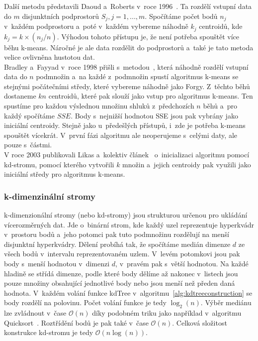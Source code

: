 Další metodu představili Daoud a~Roberts v~roce 1996~\cite{daoud96}. Ta rozdělí vstupní data do $m$ disjunktních podprostorů $S_j, j = 1,...,m$. Spočítáme počet bodů $n_j$ v~každém podprostoru a~poté v~každém vybereme náhodně $k_j$ centroidů, kde $k_j = k \times (n_j/n)$. Výhodou tohoto přístupu je, že není potřeba spouštět více běhu k-means. Náročné je ale data rozdělit do podprostorů a~také je tato metoda velice ovlivněna hustotou dat.\\

Bradley a~Fayyad v~roce 1998 přišli s~metodou~\cite{bradley98}, která náhodně rozdělí vstupní data do $n$ podmnožin a~na každé z~podmnožin spustí algoritmus \mbox{k-means} se stejnými počátečními středy, které vybereme náhodně jako Forgy. Z~těchto běhů dostaneme $kn$ centroidů, které pak slouží jako vstup pro algoritmus k-means. Ten spustíme pro každou výslednou množinu shluků z~předchozích $n$ běhů a~pro každý spočítáme $SSE$. Body s~nejnižší hodnotou SSE jsou pak vybrány jako iniciální centroidy. Stejně jako u~předešlých přístupů, i~zde je potřeba k-means spouštět vícekrát. V~první fázi algoritmu ale neoperujeme s~celými daty, ale pouze s~částmi.\\

V roce 2003 publikovali Likas a~kolektiv článek~\cite{likas03} o~inicializaci algoritmu pomocí \mbox{kd-stromu}, pomocí kterého vytvořili $k$ množin a~jejich centroidy pak využili jako iniciální středy pro algoritmus k-means.

\subsubsection{k-dimenzinální stromy}\label{sssec:kdtrees}
k-dimenzionální stromy (nebo kd-stromy) jsou strukturou určenou pro ukládání vícerozměrných dat. Jde o~binární strom, kde každý uzel reprezentuje hyperkvádr v~prostoru bodů a~jeho potomci pak tuto podmnožinu rozdělují na menší disjunktní hyperkvádry. Dělení probíhá tak, že spočítáme medián dimenze $d$ ze všech bodů v~intervalu reprezentovaném uzlem. V~levém potomkovi jsou pak body s~menší hodnotou v~dimenzi $d$, v~pravém pak s~větší hodnotou. Na každé hladině se střídá dimenze, podle které body dělíme až nakonec v~listech jsou pouze množiny obsahující jednotlivé body nebo jsou menší než předen daná hodnota. V~každém volání funkce kdTree v~algoritmu~\ref{alg:kdtreeconstruction} se body rozdělí na polovinu. Počet volání funkce je tedy $\log_2(n)$. Výběr mediánu lze zvládnout v~čase $\mathcal{O}(n)$ díky podobném triku jako například v~algoritmu Quicksort~\cite{Cormen07}. Roztřídění bodů je pak také v~čase $\mathcal{O}(n)$. Celková složitost konstrukce kd-stromu je tedy $\mathcal{O}(n \log(n))$.

